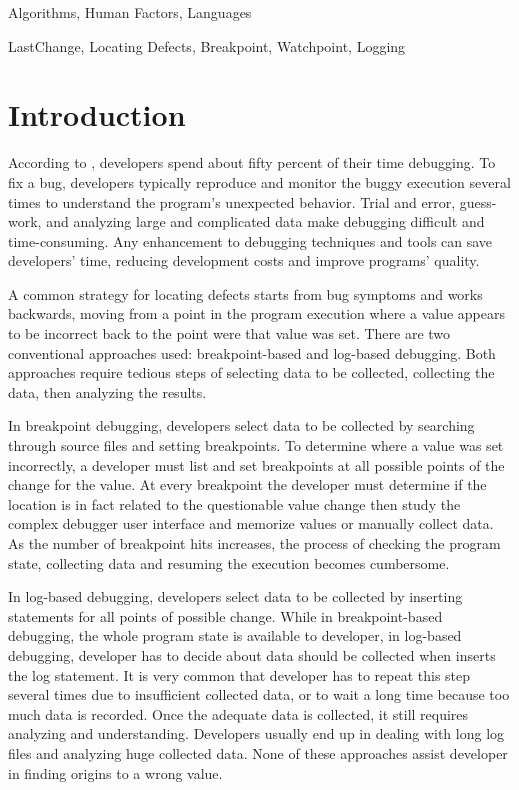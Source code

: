 \documentclass[preprint]{sigplanconf}
\begin{document}
\terms
Algorithms, Human Factors, Languages

\keywords
LastChange, Locating Defects, Breakpoint, Watchpoint, Logging

\section{Introduction}

According to \cite{LaToza}, developers spend about fifty percent of
their time debugging. To fix a bug, developers typically reproduce and
monitor the buggy execution several times to understand the program's
unexpected behavior. Trial and error, guess-work, and analyzing large
and complicated data make debugging difficult and time-consuming. Any
enhancement to debugging techniques and tools can save developers'
time, reducing development costs and improve programs' quality.

A common strategy for locating defects starts from bug symptoms and
works backwards, moving from a point in the program execution where a
value appears to be incorrect back to the point were that value was
set.  There are two conventional approaches used: breakpoint-based and
log-based debugging. Both approaches require tedious steps of
selecting data to be collected, collecting the data, then analyzing
the results. 

In breakpoint debugging, developers select data to be collected by
searching through source files and setting breakpoints. To determine
where a value was set incorrectly, a developer must list and set
breakpoints at all possible points of the change for the value. At
every breakpoint the developer must determine if the location is in
fact related to the questionable value change then study the complex
debugger user interface and memorize values or manually collect
data. As the number of breakpoint hits increases, the process of
checking the program state, collecting data and resuming the execution
becomes cumbersome.

In log-based debugging, developers select data to be collected by
inserting statements for all points of possible change.  While in
breakpoint-based debugging, the whole program state is available to
developer, in log-based debugging, developer has to decide about data
should be collected when inserts the log statement. It is very common
that developer has to repeat this step several times due to
insufficient collected data, or to wait a long time because too much
data is recorded. Once the adequate data is collected, it still
requires analyzing and understanding. Developers usually end up in
dealing with long log files and analyzing huge collected data.  None
of these approaches assist developer in finding origins to a wrong
value.
\end{document}

